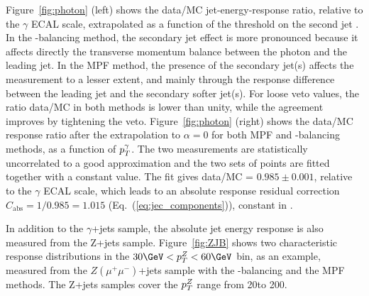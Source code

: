 Figure~\ref{fig:photon} (left) shows the data/MC jet-energy-response ratio, relative to the $\gamma$ ECAL scale, extrapolated as a function of the threshold on the second jet \pt. In the \pt-balancing method, the secondary jet effect is more pronounced because it affects directly the transverse momentum balance between the photon and the leading jet. In the MPF method, the presence of the secondary jet(s) affects the measurement to a lesser extent, and mainly through the response difference between the leading jet and the secondary softer jet(s). For loose veto values, the ratio data/MC in both methods is lower than unity, while the agreement improves by tightening the veto. Figure~\ref{fig:photon} (right) shows the data/MC response ratio after the extrapolation to $\alpha=0$ for both MPF and \pt-balancing methods, as a function of $p_{{T}}^{\gamma}$. The two measurements are statistically uncorrelated to a good approximation and the two sets of points are fitted together with a constant value. The fit gives data/MC = $0.985 \pm 0.001$, relative to the $\gamma$ ECAL scale, which leads to an absolute response residual correction $C_\text{abs}=1/0.985=1.015$ (Eq.~(\ref{eq:jec_components})), constant in \pt.  

In addition to the $\gamma$+jets sample, the absolute jet energy response is also measured from the Z+jets sample. Figure~\ref{fig:ZJB} shows two characteristic response distributions in the $30\GeV<\pt^Z<60\GeV$ bin, as an example, measured from the $Z(\mu^+\mu^-)$+jets sample with the \pt-balancing and the MPF methods. The Z+jets samples cover the $p_{{T}}^Z$ range from 20\GeV to 200\GeV. 

